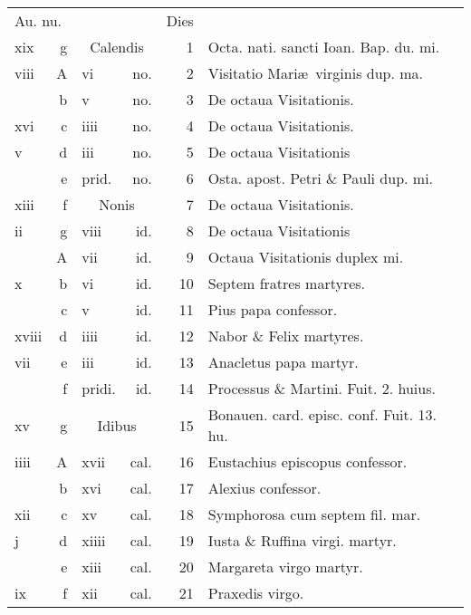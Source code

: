 \documentclass[a5paper,10pt]{book}
\def\ae{æ}
\begin{document}
\begin{center}
\begin{tabular}{l r l r r l}
\multicolumn{2}{l}{\color{red}Au. nu.} & & & \color{red} Dies & \\
xix & g & \multicolumn{2}{c}{\color{red} Calendis} & 1 & Octa. nati. sancti Ioan. Bap. du. mi. \color{black} \\
viii & \color{red} A & vi & no. & 2 & \color{red} Visitatio Mari\ae \ virginis dup. ma. \color{black} \\
 & b & v & no. & 3 & De octaua Visitationis. \color{black} \\
xvi & c & iiii & no. & 4 & De octaua Visitationis. \color{black} \\
v & d & iii & no. & 5 & De octaua Visitationis \color{black} \\
 & e & \color{red} prid. & no. & 6 & Osta. apost. Petri \& Pauli dup. mi. \color{black} \\
xiii & f & \multicolumn{2}{c}{\color{red} Nonis} & 7 & De octaua Visitationis. \\
ii & g & viii & id. & 8 & De octaua Visitationis \color{black} \\
 & \color{red} A & vii & id. & 9 & Octaua Visitationis duplex mi. \color{black} \\
x & b & vi & id. & 10 & Septem fratres martyres. \color{black} \\
 & c & v & id. & 11 & Pius papa confessor. \\
xviii & d & iiii & id. & 12 & Nabor \& Felix martyres. \color{black}\\
vii & e & iii & id. & 13 & Anacletus papa martyr. \\
 & f & \color{red} pridi. & id. & 14 & Processus \& Martini. \color{red} Fuit. 2. huius. \color{black} \\
xv & g & \multicolumn{2}{c}{\color{red} Idibus} & 15 & Bonauen. card. episc. conf. \color{red} Fuit. 13. hu. \color{black} \\
iiii & \color{red} A & xvii & cal. & 16 & Eustachius episcopus confessor. \\
 & b & xvi & cal. & 17 & Alexius confessor. \\
xii & c & xv & cal. & 18 & Symphorosa cum septem fil. mar. \\
j & d & xiiii & cal. & 19 & Iusta \& Ruffina virgi. martyr. \\
 & e & xiii & cal. & 20 & Margareta virgo martyr. \\
ix & f & xii & cal. & 21 & Praxedis virgo. \\

\end{tabular}
\end{center}
\end{document}
